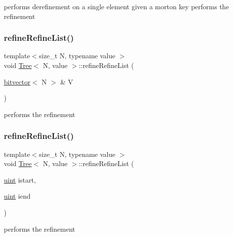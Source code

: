 performs derefinement on a single element given a morton key performs the refinement \mbox{\label{classTree_a44a82b0e29d139138605cd55427bb0bd}} 
\subsubsection{\texorpdfstring{refine\+Refine\+List()}{refineRefineList()}\hspace{0.1cm}{\footnotesize\ttfamily [2/3]}}
{\footnotesize\ttfamily template$<$size\+\_\+t N, typename value $>$ \\
void \mbox{\hyperlink{classTree}{Tree}}$<$ N, value $>$\+::refine\+Refine\+List (\begin{DoxyParamCaption}\item[{\mbox{\hyperlink{definitions_8h_a55821d7929f3f16aaf1466129c209492}{bitvector}}$<$ N $>$ \&}]{V }\end{DoxyParamCaption})}

performs the refinement \mbox{\label{classTree_a5e5fe24ceea87aeaa4931eb770e63484}} 
\subsubsection{\texorpdfstring{refine\+Refine\+List()}{refineRefineList()}\hspace{0.1cm}{\footnotesize\ttfamily [3/3]}}
{\footnotesize\ttfamily template$<$size\+\_\+t N, typename value $>$ \\
void \mbox{\hyperlink{classTree}{Tree}}$<$ N, value $>$\+::refine\+Refine\+List (\begin{DoxyParamCaption}\item[{\mbox{\hyperlink{definitions_8h_a69aa29b598b851b0640aa225a9e5d61d}{uint}}}]{istart,  }\item[{\mbox{\hyperlink{definitions_8h_a69aa29b598b851b0640aa225a9e5d61d}{uint}}}]{iend }\end{DoxyParamCaption})}

performs the refinement \mbox{\label{classTree_a69539d7a5eb07c519460846207b50ae8}} 
